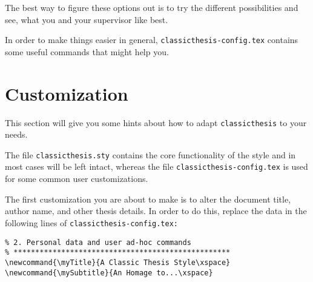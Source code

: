 \begin{itemize}
\begin{itemize}
		\end{itemize}    
 

   \end{itemize}
The best way to figure these options out is to try the different
possibilities and see, what you and your supervisor like best.

In order to make things easier in general, 
\texttt{classicthesis-config.tex} 
contains some useful commands that might help you.


\section{Customization}\label{sec:custom}
This section will give you some hints about how to adapt 
\texttt{classicthesis} to your needs.

The file \texttt{classicthesis.sty}
contains the core functionality of the style and in most cases will
be left intact, whereas the file \texttt{classic\-thesis-config.tex}
is used for some common user customizations. 

The first customization you are about to make is to alter the document
title, author name, and other thesis details. In order to do this, replace
the data in the following lines of \texttt{classicthesis-config.tex:}%

\begin{lstlisting}[frame=lt]
% **************************************************
% 2. Personal data and user ad-hoc commands
% **************************************************
\newcommand{\myTitle}{A Classic Thesis Style\xspace} 
\newcommand{\mySubtitle}{An Homage to...\xspace} 
\end{lstlisting}

